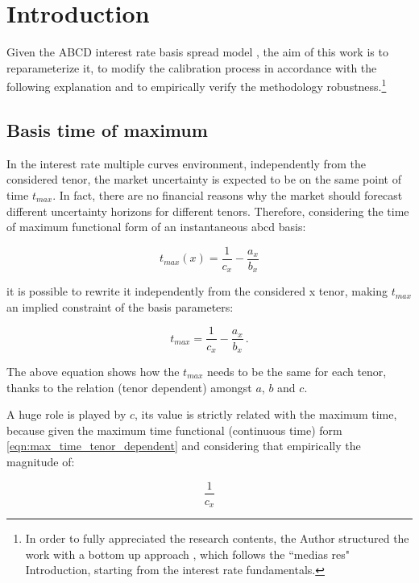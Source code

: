 \chapter{Introduction}
\label{chap:intro}

{Given the ABCD interest rate basis spread model \cite{ametrano_ballabio_mazzocchi}, the aim of this work is to reparameterize it, to modify the calibration process in accordance with the following explanation and to empirically verify the methodology robustness.\footnote{In order to fully appreciated the research contents, the Author structured the work with a bottom up approach , which follows the ``medias res" Introduction, starting from the interest rate fundamentals.}
\section*{Basis time of maximum}

In the interest rate multiple curves environment, independently from the considered tenor, the market uncertainty is expected to be on the same point of time $t_{max}$.
In fact, there are no financial reasons why the market should forecast different uncertainty horizons for different tenors.
Therefore, considering the time of maximum functional form of an instantaneous abcd basis:

\begin{equation}
t_{max}(x)=\dfrac{1}{c_{x}} - \dfrac{a_{x}} {b_{x}}
\label{eqn:max_time_tenor_dependent}
\end{equation}

it is possible to rewrite it independently from the considered x tenor, making $t_{max}$ an implied constraint of the basis parameters:

\begin{equation}
t_{max}=\dfrac{1}{c_{x}} - \dfrac{a_{x}} {b_{x}}\,.
\label{eqn:max_time}
\end{equation}

The above equation shows how the $t_{max}$ needs to be the same for each tenor, thanks to the relation (tenor dependent) amongst $a$, $b$ and $c$.

A huge role is played by $c$, its value is strictly related with the maximum time, because given the maximum time functional (continuous time) form \eqref{eqn:max_time_tenor_dependent} and considering that empirically the magnitude of:

\begin{equation*}
\dfrac{1}{c_{x}}
\end{equation*}

}
